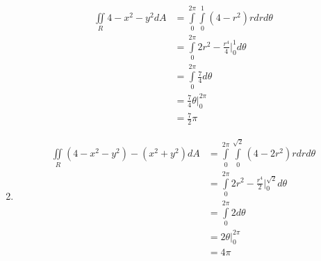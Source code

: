 \documentclass{article}
\begin{document}
\begin{enumerate}[1.]
\begin{align*}
      \iint\limits_{R} 4 - x^{2}-y^{2}dA &=
      \int\limits_{0}^{2\pi}\int\limits_{0}^{1}(4 -
      r^{2})r dr d\theta \\
      &= \int\limits_{0}^{2\pi} 2r^{2} - \frac{ r^{4} }{ 4 }
      \bigg\vert_{0}^{1}d\theta \\
      &= \int\limits_{0}^{2\pi} \frac{ 7 }{ 4 } d\theta \\
      &= \frac{ 7 }{ 4 }\theta \bigg\vert_{0}^{2\pi} \\
      &= \frac{ 7 }{ 2 } \pi
    \end{align*}
  \item \begin{align*}
      \iint\limits_{R} (4 - x^{2}-y^{2}) - (x^{2} + y^{2}) dA &=
      \int\limits_{0}^{2\pi}\int\limits_{0}^{\sqrt{2}}(4 -
      2 r^{2})r dr d\theta \\
      &= \int\limits_{0}^{2\pi} 2r^{2} - \frac{ r^{4} }{ 2 }
      \bigg\vert_{0}^{\sqrt{2}}d\theta \\
      &= \int\limits_{0}^{2\pi} 2 d\theta \\
      &= 2 \theta \bigg\vert_{0}^{2\pi} \\
      &= 4 \pi
    \end{align*}
\end{enumerate}
\end{document}
